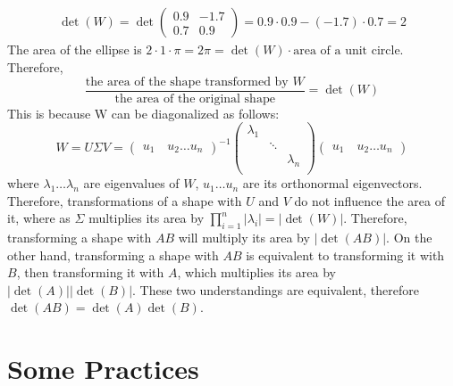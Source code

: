 \documentclass{article}
\begin{document}
    \subsection{}\label{2.4}
        \begin{align*}
            \det(W)=\det\begin{pmatrix}
                0.9 &-1.7\\
                0.7 &0.9
            \end{pmatrix}=0.9\cdot0.9-(-1.7)\cdot0.7=2
        \end{align*}
        The area of the ellipse is $2\cdot1\cdot\pi=2\pi=\det(W)\cdot\text{area of a unit circle}$. 
        Therefore,
        \begin{equation*}
            \frac{\text{the area of the shape transformed by $W$}}{\text{the area of the original shape}}=\det(W)
        \end{equation*}
        This is because W can be diagonalized as follows:
        \begin{equation*}
            W=U\Sigma V=\begin{pmatrix}u_1\quad u_2\dots u_n\end{pmatrix}^{-1}
            \begin{pmatrix}\lambda_1&\\
                &\ddots\\
                &&\lambda_n\\
            \end{pmatrix}\begin{pmatrix}u_1\quad u_2\dots u_n\end{pmatrix}
        \end{equation*}
        where $\lambda_1\dots \lambda_n$ are eigenvalues of $W$, $u_1\dots u_n$ are its orthonormal eigenvectors.
        Therefore, transformations of a shape with $U$ and $V$ do not influence the area of it,
        where as $\Sigma$ multiplies its area by $\prod_{i=1}^n |\lambda_i|=|\det(W)|$. 
        Therefore, transforming a shape with $AB$ will multiply its area by $|\det(AB)|$. 
        On the other hand, transforming a shape with $AB$ is equivalent to transforming it with $B$,
        then transforming it with $A$, which multiplies its area by $|\det(A)||\det(B)|$.
        These two understandings are equivalent, therefore $\det(AB)=\det(A)\det(B)$.


    \section{Some Practices}
    
\end{document}
